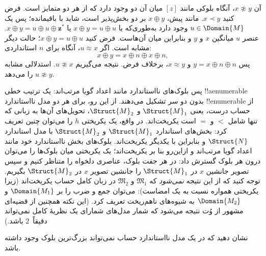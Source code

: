 \documentclass[../../../include/open-logic-section]{subfiles}
\begin{document}
\begin{enumerate}
  آن $x \not\approx y$، آنگاه بلوکی مانند $[z]$ میان آن دو وجود دارد
  که از هر دو متمایز است. فرض کنید $x \prec y$. مانند پیش،
  $x \oplus y$ بر دو بخش‌پذیر است، شاید با باقیمانده؛ پس یک
  $u \in \Domain{M}$ وجود دارد به‌طوری‌که یا
  $x \oplus y = u \oplus u$ یا
  $x \oplus y = u \oplus u \oplus \mathbf{z}^*$. عنصر $u$ میانگین
  $x$ و $y$ و بنابراین میان آن‌هاست. فرض کنید
  $x \oplus y = u \oplus u$؛ حالت دیگر مشابه است. اگر
  $u \approx x$، آنگاه برای $n$ استانداردی:
  \[
  x \oplus y = x \oplus n \oplus x \oplus n,
  \]
  پس $y = x \oplus n \oplus n$ و $x \approx y$، برخلاف فرض. نتیجه
  می‌گیریم $u \not\approx x$. استدلالی مشابه
  $u \not\approx y$ را می‌دهد.
\end{enumerate}

پس بلوک‌های نااستاندارد مانند اعداد گویا مرتب‌اند: یک ترتیب خطی
!!a{enumerable} بدون دو سر تشکیل می‌دهند. از این رو، برای هر دو مدل
نااستاندارد !!{enumerable} از حساب درست، یعنی $\Struct{M}_1$ و
$\Struct{M}_2$، تحویل‌های آن‌ها به زبانی که تنها شامل $<$ و $=$ است
یکریخت‌اند. در واقع، یک یکریختی $h$ را می‌توان چنین تعریف کرد: بخش‌های
استاندارد $\Struct{M}_1$ و $\Struct{M}_2$ با مدل استاندارد
$\Struct{N}$ و بنابراین با یکدیگر یکریخت‌اند. بلوک‌های بخش نااستاندارد
خود مانند اعداد گویا مرتب‌اند و ازاین‌رو بنا بر
 یکریخت‌اند؛ یک یکریختی میان بلوک‌ها را می‌توان
درون هر بلوک گسترش داد: در هر جفت بلوک، عناصری دلخواه را متناظر کنیم و
سپس تصویر جانشین $x$ در $\Struct{M}_1$ را جانشین تصویر $x$ در
$\Struct{M}_2$ بگیریم. توجه کنید که از این نتیجه \emph{نمی‌شود} که
$\mathfrak{M}_1$ و $\mathfrak{M}_2$ در زبان کامل حساب یکریخت‌اند
(زیرا یکریختی همواره نسبت به یک امضاست): می‌توان جمع و ضرب را بر
$\Domain{M_1}$ و $\Domain{M_2}$ به شیوه‌های ناهم‌ریخت تعریف کرد.
(این نکته همچنین از قضیه‌ای مشهور از وُت نتیجه می‌شود که شمار مدل‌های
شمارای یک نظریهٔ کامل نمی‌تواند دقیقاً~$2$ باشد.)

\begin{prob}
نشان دهید که در یک مدل نااستاندارد حساب نمی‌تواند بزرگ‌ترین بلوک وجود
داشته باشد.
\end{prob}
\end{document}
